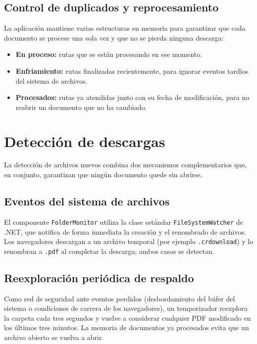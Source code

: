 \documentclass[11pt,a4paper]{article}
\begin{document}
\subsection{Control de duplicados y reprocesamiento}
La aplicación mantiene varias estructuras en memoria para garantizar que cada
documento se procese una sola vez y que no se pierda ninguna descarga:

\begin{itemize}[leftmargin=1.4em,itemsep=2pt]
  \item \textbf{En proceso:} rutas que se están procesando en ese momento.
  \item \textbf{Enfriamiento:} rutas finalizadas recientemente, para ignorar
        eventos tardíos del sistema de archivos.
  \item \textbf{Procesados:} rutas ya atendidas junto con su fecha de
        modificación, para no reabrir un documento que no ha cambiado.
\end{itemize}

\section{Detección de descargas}
La detección de archivos nuevos combina dos mecanismos complementarios que, en
conjunto, garantizan que ningún documento quede sin abrirse.

\subsection{Eventos del sistema de archivos}
El componente \texttt{FolderMonitor} utiliza la clase estándar
\texttt{FileSystemWatcher} de .NET, que notifica de forma inmediata la creación y
el renombrado de archivos. Los navegadores descargan a un archivo temporal (por
ejemplo \texttt{.crdownload}) y lo renombran a \texttt{.pdf} al completar la
descarga; ambos casos se detectan.

\subsection{Reexploración periódica de respaldo}
Como red de seguridad ante eventos perdidos (desbordamiento del búfer del sistema
o condiciones de carrera de los navegadores), un temporizador reexplora la
carpeta cada tres segundos y vuelve a considerar cualquier PDF modificado en los
últimos tres minutos. La memoria de documentos ya procesados evita que un
archivo abierto se vuelva a abrir.
\end{document}
